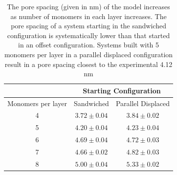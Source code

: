 \documentclass{article}
\begin{document}
  
  \begin{table}[h]
  \centering
  \begin{tabular}{ccc}
  \toprule
  		   & \multicolumn{2}{c}{Starting Configuration} \\
  \hline
  Monomers per layer & Sandwiched & Parallel Displaced \\
  \midrule
  4 & $3.72 \pm 0.04$ & $3.84 \pm 0.02$ \\  %
  5 & $4.20 \pm 0.04$ & $4.23 \pm 0.04$ \\
  6 & $4.69 \pm 0.04$ & $4.72 \pm 0.03$ \\
  7 & $4.66 \pm 0.02$ & $4.82 \pm 0.03$ \\  %
  8 & $5.00 \pm 0.04$ & $5.33 \pm 0.02$ \\
  \bottomrule
  \end{tabular}
  \caption{The pore spacing (given in nm) of the model increases as
  number of monomers in each layer increases. The pore spacing of a system
  starting in the sandwiched configuration is systematically lower than 
  that started in an offset configuration. Systems built with 5 monomers
  per layer in a parallel displaced configuration result in a pore spacing
  closest to the experimental 4.12 nm}
  \label{table:p2p} 
  \end{table}
  
\end{document}
